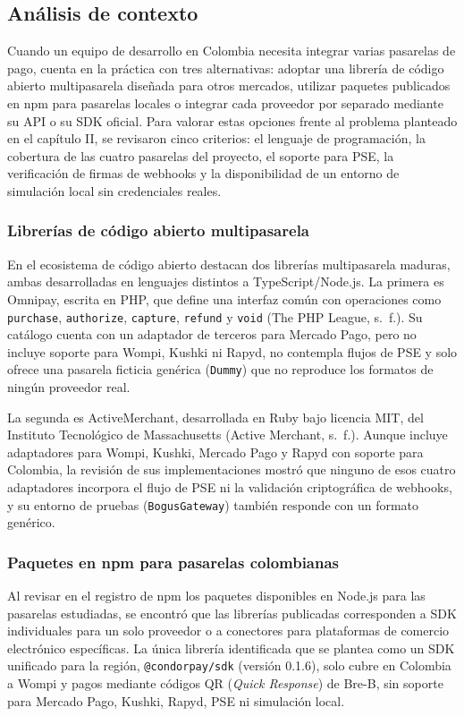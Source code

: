\subsection{Análisis de contexto}
Cuando un equipo de desarrollo en Colombia necesita integrar varias pasarelas de pago, cuenta en la práctica con tres alternativas: adoptar una librería de código abierto multipasarela diseñada para otros mercados, utilizar paquetes publicados en npm para pasarelas locales o integrar cada proveedor por separado mediante su API o su SDK oficial. Para valorar estas opciones frente al problema planteado en el capítulo II, se revisaron cinco criterios: el lenguaje de programación, la cobertura de las cuatro pasarelas del proyecto, el soporte para PSE, la verificación de firmas de webhooks y la disponibilidad de un entorno de simulación local sin credenciales reales.

\subsubsection{Librerías de código abierto multipasarela}
En el ecosistema de código abierto destacan dos librerías multipasarela maduras, ambas desarrolladas en lenguajes distintos a TypeScript/Node.js. La primera es Omnipay, escrita en PHP, que define una interfaz común con operaciones como \texttt{purchase}, \texttt{authorize}, \texttt{capture}, \texttt{refund} y \texttt{void} (The PHP League, s.~f.). Su catálogo cuenta con un adaptador de terceros para Mercado Pago, pero no incluye soporte para Wompi, Kushki ni Rapyd, no contempla flujos de PSE y solo ofrece una pasarela ficticia genérica (\texttt{Dummy}) que no reproduce los formatos de ningún proveedor real.

La segunda es ActiveMerchant, desarrollada en Ruby bajo licencia MIT, del Instituto Tecnológico de Massachusetts (Active Merchant, s.~f.). Aunque incluye adaptadores para Wompi, Kushki, Mercado Pago y Rapyd con soporte para Colombia, la revisión de sus implementaciones mostró que ninguno de esos cuatro adaptadores incorpora el flujo de PSE ni la validación criptográfica de webhooks, y su entorno de pruebas (\texttt{BogusGateway}) también responde con un formato genérico.

\subsubsection{Paquetes en npm para pasarelas colombianas}
Al revisar en el registro de npm los paquetes disponibles en Node.js para las pasarelas estudiadas, se encontró que las librerías publicadas corresponden a SDK individuales para un solo proveedor o a conectores para plataformas de comercio electrónico específicas. La única librería identificada que se plantea como un SDK unificado para la región, \texttt{@condorpay/sdk} (versión 0.1.6), solo cubre en Colombia a Wompi y pagos mediante códigos QR (\textit{Quick Response}) de Bre-B, sin soporte para Mercado Pago, Kushki, Rapyd, PSE ni simulación local.

